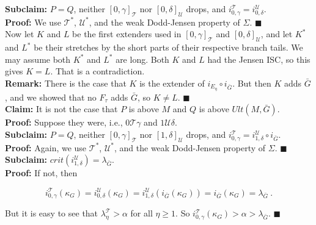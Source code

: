 \documentclass[12pt]{article}
\begin{document}
\textbf{Subclaim:} $P = Q$, neither $[0, \gamma]_{\mathscr{T}}$ nor $[ 0 , \delta ]_{\mathscr{U}}$ drops, and $i_{0, \gamma}^{\mathscr{T}} = i_{0, \delta}^{\mathscr{U}}$.\\

\textbf{Proof:} We use $\mathscr{T}^*$, $\mathscr{U}^*$, and the weak Dodd-Jensen property of $\Sigma$. $\blacksquare$\\

Now let $K$ and $L$ be the first extenders used in $[0 , \gamma ]_{\mathscr{T}}$ and $[0, \delta ]_{\mathscr{U}}$, and let $K^*$ and $L^*$ be their stretches by the short parts of their respective branch tails.  We may assume both $K^*$ and $L^*$ are long.  Both $K$ and $L$ had the Jensen ISC, so this gives $K = L$.  That is a contradiction.\\

\textbf{Remark:} There is the case that $K$ is the extender of $i_{E_\eta} \circ i_{\bar{G}}$.  But then $K$ adds $\bar{G}$, and we showed that no $F_{\tau}$ adds $\bar{G}$, so $K \neq L$. $\blacksquare$\\


\textbf{Claim:} It is not the case that $P$ is above $M$ and $Q$ is above $Ult (M, \bar{G} )$.\\

\textbf{Proof:} Suppose they were, i.e., $0 \mathscr{T} \gamma$ and $1 \mathscr{U} \delta$.\\

\textbf{Subclaim:} $P = Q$, neither $[0, \gamma ]_{\mathscr{T}}$ nor $[1, \delta ]_{\mathscr{U}}$ drops, and $i_{0, \gamma}^{\mathscr{T}} = i_{1, \delta}^{\mathscr{U}} \circ i_{\bar{G}}$.\\

\textbf{Proof:} Again, we use $\mathscr{T}^*$, $\mathscr{U}^*$, and the weak Dodd-Jensen property of $\Sigma$. $\blacksquare$\\

\textbf{Subclaim:} $crit (i_{1, \delta}^{\mathscr{U}}) = \lambda_{\bar{G}}$.\\

\textbf{Proof:} If not, then

\[
i_{0, \gamma}^{\mathscr{T}} (\kappa_G ) = i_{0, \delta}^{\mathscr{U}} (\kappa_G ) = i_{1, \delta }^{\mathscr{U}} (i_{\bar{G}} (\kappa_G)) = i_{\bar{G}} (\kappa_G) = \lambda_{\bar{G}} \ .
\]

But it is easy to see that $\lambda_\eta^{\mathscr{T}} > \alpha$ for all $\eta \geq 1$.  So $i_{0, \gamma }^{\mathscr{T}} (\kappa_G ) > \alpha > \lambda_{\bar{G}}$. $\blacksquare$\\
\end{document}
